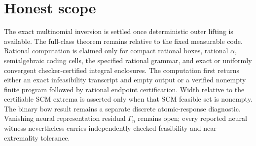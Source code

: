 \documentclass{article}
\begin{document}
\section{Honest scope}

The exact multinomial inversion is settled once deterministic outer lifting is available. The full-class theorem remains relative to the fixed measurable code. Rational computation is claimed only for compact rational boxes, rational \(\alpha\), semialgebraic coding cells, the specified rational grammar, and exact or uniformly convergent checker-certified integral enclosures. The computation first returns either an exact infeasibility transcript and empty output or a verified nonempty finite program followed by rational endpoint certification. Width relative to the certifiable SCM extrema is asserted only when that SCM feasible set is nonempty. The binary bow result remains a separate discrete atomic-response diagnostic. Vanishing neural representation residual \(\Gamma_n\) remains open; every reported neural witness nevertheless carries independently checked feasibility and near-extremality tolerance.
\end{document}
